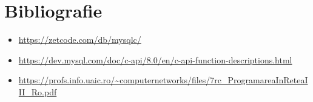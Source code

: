 \documentclass{article}
\begin{document}
\section{Bibliografie}
\begin{itemize}
    \item \url{https://zetcode.com/db/mysqlc/}
    \item \url{https://dev.mysql.com/doc/c-api/8.0/en/c-api-function-descriptions.html}
    \item \url{https://profs.info.uaic.ro/~computernetworks/files/7rc_ProgramareaInReteaIII_Ro.pdf}
    \end{itemize}
\end{document}
